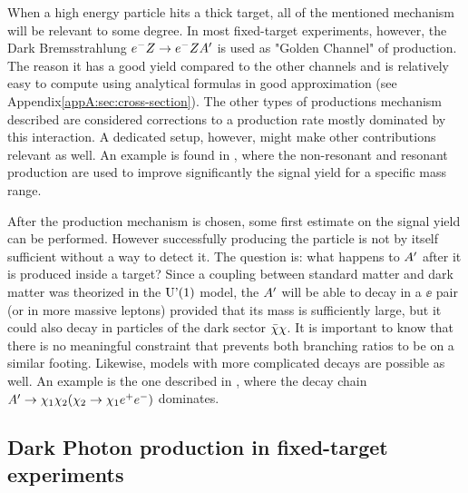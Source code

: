 When a high energy particle hits a thick target, all of the mentioned mechanism will be relevant to some degree. %
In most fixed-target experiments, however, the Dark Bremsstrahlung $e^- Z \to e^- Z A'$ is used as "Golden Channel" of production. The reason it has a good yield compared to the other channels and is relatively easy to compute using analytical formulas in good approximation (see Appendix\ref{appA:sec:cross-section}). The other types of productions mechanism described are considered corrections to a production rate mostly dominated by this interaction. A dedicated setup, however, might make other contributions relevant as well. An example is found in \cite{Marsicano_2018}, where the non-resonant and resonant production are used to improve significantly the signal yield for a specific mass range.

After the production mechanism is chosen, some first estimate on the signal yield can be performed. However successfully producing the particle is not by itself sufficient without a way to detect it. The question is: what happens to $A'$ after it is produced inside a target? Since a coupling between standard matter and dark matter was theorized in the $\textrm{U'(1)}$ model, the $A'$ will be able to decay in a $\ee$ pair (or in more massive leptons) provided that its mass is sufficiently large, but it could also decay in particles of the dark sector $\bar{\chi} \chi$. It is important to know that there is no meaningful constraint that prevents both branching ratios to be on a similar footing. Likewise, models with more complicated decays are possible as well. An example is the one described in \cite{Mohlabeng_2019}, where the decay chain $A' \to \chi_1 \chi_2(\chi_2 \to \chi_1 e^+e^-)$ dominates. 

\subsection{Dark Photon production in fixed-target experiments}
\label{ch1:sec:dm-u1model}

